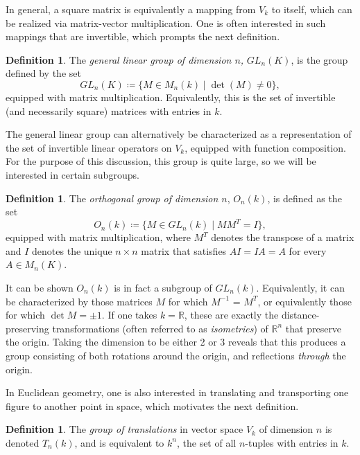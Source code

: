 \documentclass{article}
\theoremstyle{definition}
\newtheorem{definition}[theorem]{Definition} %
\newcommand{\RR}{\mathbb{R}}
\newcommand{\definedas}[0]{\coloneqq}
\newcommand{\theset}[1]{\{ #1 \}}
\begin{document}
In general, a square matrix is equivalently a mapping from
\(V_k\) to itself, which can be realized via matrix-vector multiplication. One is often
interested in such mappings that are invertible, which prompts the next
definition.

\begin{definition} The \emph{general linear group of dimension \(n\),}
\(GL_n(K)\), is the group defined by the set
\[GL_n(K) \definedas \theset{M \in M_n(k) \mid \det (M) \neq 0},\] 
equipped with matrix multiplication. Equivalently, this is
the set of invertible
(and necessarily square) matrices with entries in \(k\).
\end{definition}

The general linear group can alternatively be characterized as a representation of the set of
invertible linear operators on \(V_k\), equipped with
function composition. For the purpose of this discussion, this group is
quite large, so we will be interested in certain subgroups.

\begin{definition} The \emph{orthogonal group of dimension \(n\)}, \(O_n(k)\),
is defined as the set \[O_n(k) \definedas \theset{M \in GL_n(k) \mid MM^T = I},\]
equipped with matrix multiplication, where
\(M^T\) denotes the transpose of a matrix and \(I\) denotes the unique $n\times n$ matrix that satisfies \(AI = IA = A\) for every
\(A\in M_n(K)\).
\end{definition}

It can be shown \(O_n(k)\) is in fact a subgroup of \(GL_n(k)\).
Equivalently, it can be characterized by those matrices \(M\) for which
\(M^{-1}\) = \(M^T\), or equivalently those for which \(\det M = \pm 1\). If
one takes \(k=\RR\), these are exactly the distance-preserving
transformations (often referred to as \emph{isometries}) of \(\RR^n\)
that preserve the origin. Taking the dimension to be either 2 or 3
reveals that this produces a group consisting of both rotations around
the origin, and reflections \emph{through} the origin.

In Euclidean geometry, one is also interested in translating and
transporting one figure to another point in space, which motivates the
next definition.

\begin{definition} The \emph{group of translations} in vector space \(V_k\) of
dimension \(n\) is denoted \(T_n(k)\), and is equivalent to \(k^n\), the
set of all \(n\)-tuples with entries in \(k\).
\end{definition}
\end{document}
